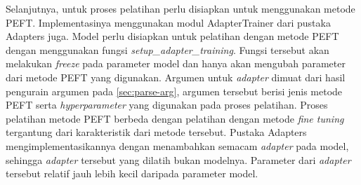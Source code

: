 Selanjutnya, untuk proses pelatihan perlu disiapkan untuk menggunakan metode PEFT. Implementasinya menggunakan modul AdapterTrainer dari pustaka Adapters juga. Model perlu disiapkan untuk pelatihan dengan metode PEFT dengan menggunakan fungsi \textit{setup\_adapter\_training}. Fungsi tersebut akan melakukan \textit{freeze} pada parameter model dan hanya akan mengubah parameter dari metode PEFT yang digunakan. Argumen untuk \textit{adapter} dimuat dari hasil pengurain argumen pada \ref{sec:parse-arg}, argumen tersebut berisi jenis metode PEFT serta \textit{hyperparameter} yang digunakan pada proses pelatihan. Proses pelatihan metode PEFT berbeda dengan pelatihan dengan metode \textit{fine tuning} tergantung dari karakteristik dari metode tersebut. Pustaka Adapters mengimplementasikannya dengan menambahkan semacam \textit{adapter} pada model, sehingga \textit{adapter} tersebut yang dilatih bukan modelnya. Parameter dari \textit{adapter} tersebut relatif jauh lebih kecil daripada parameter model.
